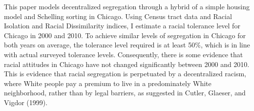 This paper models decentralized segregation through a hybrid of a simple housing model and Schelling sorting in Chicago. Using Census tract data and Racial Isolation and Racial Dissimilarity indices, I estimate a racial tolerance level for Chicago in 2000 and 2010. To achieve similar levels of segregation in Chicago for both years on average, the tolerance level required is at least 50\%, which is in line with actual surveyed tolerance levels.  Consequently, there is some evidence that racial attitudes in Chicago have not changed significantly between 2000 and 2010. This is evidence that racial segregation is perpetuated by a decentralized racism, where White people pay a premium to live in a predominately White neighborhood, rather than by legal barriers, as suggested in Cutler, Glaeser, and Vigdor (1999).